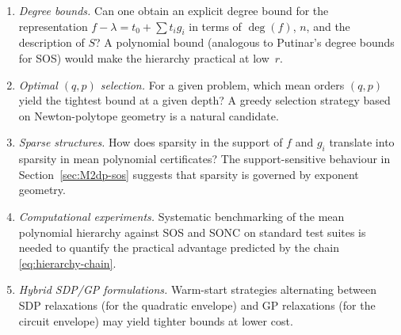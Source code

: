 \documentclass{amsart}
\theoremstyle{definition}
\numberwithin{equation}{section}
\begin{document}
\begin{enumerate}
  \item \textit{Degree bounds.}  Can one obtain an explicit degree bound for
  the representation $f-\lambda=t_0+\sum t_ig_i$ in terms of $\deg(f)$,
  $n$, and the description of $S$?  A polynomial bound (analogous to
  Putinar's degree bounds for SOS) would make the hierarchy practical at
  low~$r$.

  \item \textit{Optimal $(q,p)$ selection.}  For a given problem, which
  mean orders $(q,p)$ yield the tightest bound at a given depth?  A greedy
  selection strategy based on Newton-polytope geometry is a natural
  candidate.

  \item \textit{Sparse structures.}  How does sparsity in the support of
  $f$ and $g_i$ translate into sparsity in mean polynomial certificates?
  The support-sensitive behaviour in Section~\ref{sec:M2dp-sos} suggests
  that sparsity is governed by exponent geometry.

  \item \textit{Computational experiments.}  Systematic benchmarking of the
  mean polynomial hierarchy against SOS and SONC on standard test suites
  is needed to quantify the practical advantage predicted by the chain
  \eqref{eq:hierarchy-chain}.

  \item \textit{Hybrid SDP/GP formulations.}  Warm-start strategies
  alternating between SDP relaxations (for the quadratic envelope) and GP
  relaxations (for the circuit envelope) may yield tighter bounds at lower
  cost.
\end{enumerate}
\end{document}
